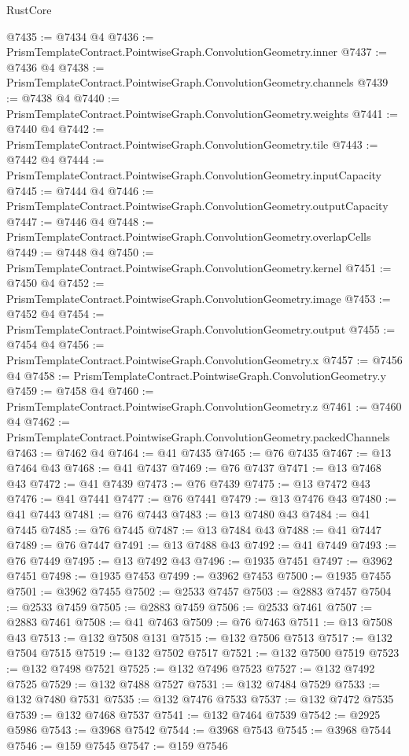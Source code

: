 \begin{lexlean}{RustCore}
\begin{coremodule}
@7435 := @7434 @4
@7436 := PrismTemplateContract.PointwiseGraph.ConvolutionGeometry.inner
@7437 := @7436 @4
@7438 := PrismTemplateContract.PointwiseGraph.ConvolutionGeometry.channels
@7439 := @7438 @4
@7440 := PrismTemplateContract.PointwiseGraph.ConvolutionGeometry.weights
@7441 := @7440 @4
@7442 := PrismTemplateContract.PointwiseGraph.ConvolutionGeometry.tile
@7443 := @7442 @4
@7444 := PrismTemplateContract.PointwiseGraph.ConvolutionGeometry.inputCapacity
@7445 := @7444 @4
@7446 := PrismTemplateContract.PointwiseGraph.ConvolutionGeometry.outputCapacity
@7447 := @7446 @4
@7448 := PrismTemplateContract.PointwiseGraph.ConvolutionGeometry.overlapCells
@7449 := @7448 @4
@7450 := PrismTemplateContract.PointwiseGraph.ConvolutionGeometry.kernel
@7451 := @7450 @4
@7452 := PrismTemplateContract.PointwiseGraph.ConvolutionGeometry.image
@7453 := @7452 @4
@7454 := PrismTemplateContract.PointwiseGraph.ConvolutionGeometry.output
@7455 := @7454 @4
@7456 := PrismTemplateContract.PointwiseGraph.ConvolutionGeometry.x
@7457 := @7456 @4
@7458 := PrismTemplateContract.PointwiseGraph.ConvolutionGeometry.y
@7459 := @7458 @4
@7460 := PrismTemplateContract.PointwiseGraph.ConvolutionGeometry.z
@7461 := @7460 @4
@7462 := PrismTemplateContract.PointwiseGraph.ConvolutionGeometry.packedChannels
@7463 := @7462 @4
@7464 := @41 @7435
@7465 := @76 @7435
@7467 := @13 @7464 @43
@7468 := @41 @7437
@7469 := @76 @7437
@7471 := @13 @7468 @43
@7472 := @41 @7439
@7473 := @76 @7439
@7475 := @13 @7472 @43
@7476 := @41 @7441
@7477 := @76 @7441
@7479 := @13 @7476 @43
@7480 := @41 @7443
@7481 := @76 @7443
@7483 := @13 @7480 @43
@7484 := @41 @7445
@7485 := @76 @7445
@7487 := @13 @7484 @43
@7488 := @41 @7447
@7489 := @76 @7447
@7491 := @13 @7488 @43
@7492 := @41 @7449
@7493 := @76 @7449
@7495 := @13 @7492 @43
@7496 := @1935 @7451
@7497 := @3962 @7451
@7498 := @1935 @7453
@7499 := @3962 @7453
@7500 := @1935 @7455
@7501 := @3962 @7455
@7502 := @2533 @7457
@7503 := @2883 @7457
@7504 := @2533 @7459
@7505 := @2883 @7459
@7506 := @2533 @7461
@7507 := @2883 @7461
@7508 := @41 @7463
@7509 := @76 @7463
@7511 := @13 @7508 @43
@7513 := @132 @7508 @131
@7515 := @132 @7506 @7513
@7517 := @132 @7504 @7515
@7519 := @132 @7502 @7517
@7521 := @132 @7500 @7519
@7523 := @132 @7498 @7521
@7525 := @132 @7496 @7523
@7527 := @132 @7492 @7525
@7529 := @132 @7488 @7527
@7531 := @132 @7484 @7529
@7533 := @132 @7480 @7531
@7535 := @132 @7476 @7533
@7537 := @132 @7472 @7535
@7539 := @132 @7468 @7537
@7541 := @132 @7464 @7539
@7542 := @2925 @5986
@7543 := @3968 @7542
@7544 := @3968 @7543
@7545 := @3968 @7544
@7546 := @159 @7545
@7547 := @159 @7546

\end{coremodule}
\end{lexlean}

